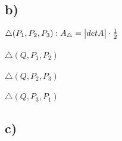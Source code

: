 \subsection*{b)}
$
\triangle (P_1, P_2, P_3):\\
A_{\triangle} =
\begin{vmatrix}
detA
\end{vmatrix}
\cdot \frac{1}{2}
$\\\\

\noindent$
\triangle (Q, P_1, P_2)
$\\\\

\noindent$
\triangle (Q, P_2, P_3)
$\\\\

\noindent$
\triangle (Q, P_3, P_1)
$
\subsection*{c)}


